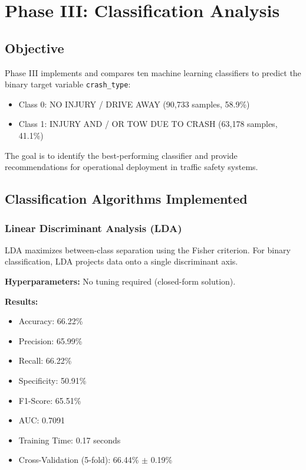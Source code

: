 \documentclass[12pt,man]{apa7}
\begin{document}
\section{Phase III: Classification Analysis}

\subsection{Objective}

Phase III implements and compares ten machine learning classifiers to predict the binary target variable \texttt{crash\_type}:
\begin{itemize}
    \item Class 0: NO INJURY / DRIVE AWAY (90,733 samples, 58.9\%)
    \item Class 1: INJURY AND / OR TOW DUE TO CRASH (63,178 samples, 41.1\%)
\end{itemize}

The goal is to identify the best-performing classifier and provide recommendations for operational deployment in traffic safety systems.

\subsection{Classification Algorithms Implemented}

\subsubsection{Linear Discriminant Analysis (LDA)}

LDA maximizes between-class separation using the Fisher criterion. For binary classification, LDA projects data onto a single discriminant axis.

\textbf{Hyperparameters:} No tuning required (closed-form solution).

\textbf{Results:}
\begin{itemize}
    \item Accuracy: 66.22\%
    \item Precision: 65.99\%
    \item Recall: 66.22\%
    \item Specificity: 50.91\%
    \item F1-Score: 65.51\%
    \item AUC: 0.7091
    \item Training Time: 0.17 seconds
    \item Cross-Validation (5-fold): 66.44\% $\pm$ 0.19\%
\end{itemize}
\end{document}
